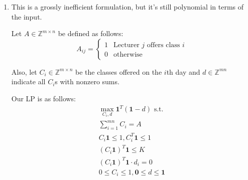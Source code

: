 \documentclass[12pt]{article}
\begin{document}
\begin{enumerate}
\begin{enumerate}
            \end{enumerate}

      \item This is a grossly inefficient formulation, but it's still
            polynomial in terms of the input.

            Let $A \in \mathbb{Z}^{m \times n}$ be defined as follows:
            \[A_{ij}=\begin{cases}
                        1 & \text{Lecturer $j$ offers class $i$} \\
                        0 & \text{otherwise}
                  \end{cases}\]

            Also, let $C_{i} \in \mathbb{Z}^{m \times n}$ be the classes offered on the $i$th day
            and $d \in \mathbb{Z}^{mn}$ indicate all $C_i$s with nonzero sums.

            Our LP is as follows:
            \begin{gather*}
                  \max_{C_{i}, d} \mathbf{1}^T(\mathbf{1}-d) \text{ s.t.} \\
                  \sum_{i=1}^{mn} C_{i}=A \\
                  C_i\mathbf{1} \le 1, C_i^T\mathbf{1} \le 1 \\
                  \left(C_i\mathbf{1}\right)^T\mathbf{1} \le K \\
                  \left(C_i\mathbf{1}\right)^T\mathbf{1} \cdot d_i = 0 \\
                  0 \le C_i \le 1, \mathbf{0} \le d \le \mathbf{1}
            \end{gather*}
\end{enumerate}
\end{document}
